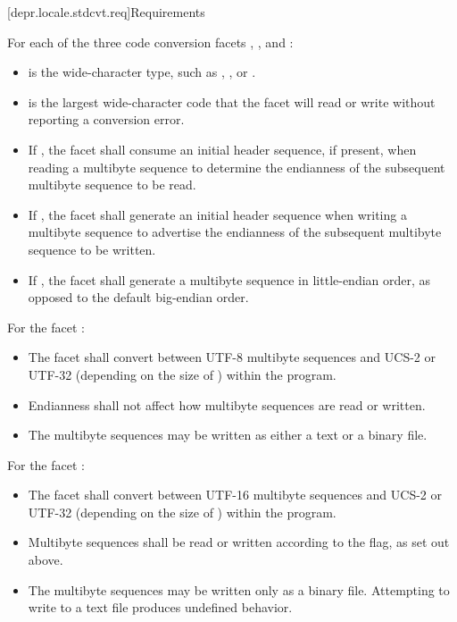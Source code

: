 [depr.locale.stdcvt.req]{Requirements}

\pnum
For each of the three code conversion facets ,
, and :
\begin{itemize}
\item
   is the wide-character type, such as
  , , or .
\item
   is the largest wide-character code that the facet
  will read or write without reporting a conversion error.
\item
  If , the facet shall consume an
  initial header sequence, if present, when reading a multibyte sequence
  to determine the endianness of the subsequent multibyte sequence to be read.
\item
  If , the facet shall generate an
  initial header sequence when writing a multibyte sequence to advertise
  the endianness of the subsequent multibyte sequence to be written.
\item
  If , the facet shall generate a
  multibyte sequence in little-endian order,
  as opposed to the default big-endian order.
\end{itemize}

\pnum
For the facet :
\begin{itemize}
\item
  The facet shall convert between UTF-8 multibyte sequences
  and UCS-2 or UTF-32 (depending on the size of )
  within the program.
\item
  Endianness shall not affect how multibyte sequences are read or written.
\item
  The multibyte sequences may be written as either a text or a binary file.
\end{itemize}

\pnum
For the facet :
\begin{itemize}
\item
  The facet shall convert between UTF-16 multibyte sequences
  and UCS-2 or UTF-32 (depending on the size of )
  within the program.
\item
  Multibyte sequences shall be read or written
  according to the  flag, as set out above.
\item
  The multibyte sequences may be written only as a binary file.
  Attempting to write to a text file produces undefined behavior.
\end{itemize}

